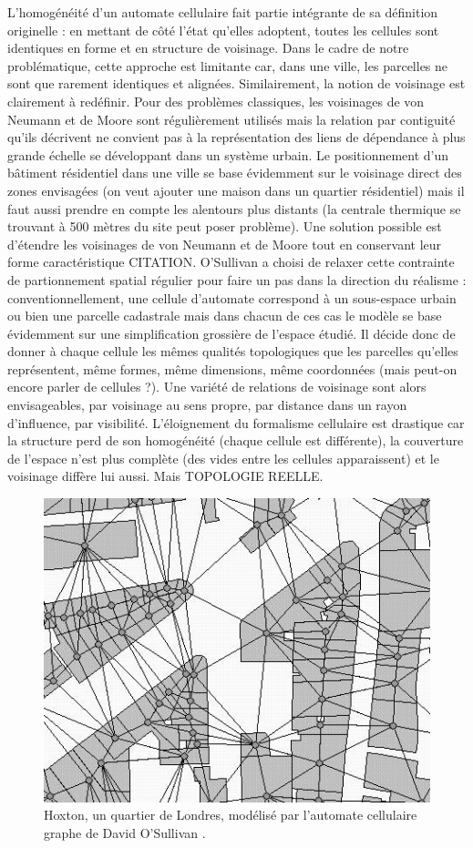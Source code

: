 \documentclass[12pt]{article}
\begin{document}
L'homogénéité d'un automate cellulaire fait partie intégrante de sa
définition originelle : en mettant de côté l'état qu'elles adoptent,
toutes les cellules sont identiques en forme et en structure de
voisinage. Dans le cadre de notre problématique, cette approche est
limitante car, dans une ville, les parcelles ne sont que rarement
identiques et alignées. Similairement, la notion de voisinage est
clairement à redéfinir. Pour des problèmes classiques, les voisinages
de von Neumann et de Moore sont régulièrement utilisés mais la
relation par contiguité qu'ils décrivent ne convient pas à la
représentation des liens de dépendance à plus grande échelle se
développant dans un système urbain. Le positionnement d'un bâtiment
résidentiel dans une ville se base évidemment sur le voisinage direct
des zones envisagées (on veut ajouter une maison dans un quartier
résidentiel) mais il faut aussi prendre en compte les alentours plus
distants (la centrale thermique se trouvant à 500 mètres du site peut
poser problème). Une solution possible est d'étendre les voisinages de
von Neumann et de Moore tout en conservant leur forme caractéristique
CITATION. O'Sullivan a choisi de relaxer cette contrainte de
partionnement spatial régulier pour faire un pas dans la direction du
réalisme \cite{O'Sullivan2000,O'Sullivan2001} : conventionnellement,
une cellule d'automate correspond à un sous-espace urbain ou bien une
parcelle cadastrale mais dans chacun de ces cas le modèle se base
évidemment sur une simplification grossière de l'espace étudié. Il
décide donc de donner à chaque cellule les mêmes qualités topologiques
que les parcelles qu'elles représentent, même formes, même dimensions,
même coordonnées (mais peut-on encore parler de cellules ?). Une
variété de relations de voisinage sont alors envisageables, par
voisinage au sens propre, par distance dans un rayon d'influence, par
visibilité. L'éloignement du formalisme cellulaire est drastique car
la structure perd de son homogénéité (chaque cellule est différente),
la couverture de l'espace n'est plus complète (des vides entre les
cellules apparaissent) et le voisinage diffère lui aussi. Mais
TOPOLOGIE REELLE.

\begin{figure}
  \centering
  \includegraphics[width=.7\linewidth]{images/gca.png}
  \caption{Hoxton, un quartier de Londres, modélisé par l'automate
    cellulaire graphe de David O'Sullivan \cite{O'Sullivan2000}.}
  \label{fig:sullivan}
\end{figure}
\end{document}
